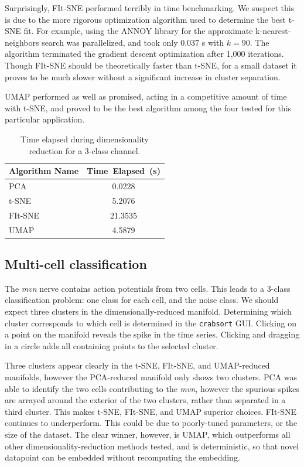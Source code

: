 \documentclass{article}
\begin{document}
Surprisingly, FIt-SNE performed terribly in time benchmarking.
We suspect this is due to the more rigorous optimization algorithm used
to determine the best t-SNE fit.
For example, using the ANNOY library for the approximate k-nearest-neighbors
search was parallelized, and took only 0.037 s with $k=90$.
The algorithm terminated the gradient descent optimization after 1,000 iterations.
Though FIt-SNE should be theoretically faster than t-SNE, for a small dataset
it proves to be much slower without a significant increase in cluster separation.

UMAP performed as well as promised, acting in a competitive amount of time with t-SNE,
and proved to be the best algorithm among the four tested for this particular application.

\begin{table}
  \caption{Time elapsed during dimensionality reduction for a 3-class channel.}
  \label{tbl:dim-red-time-1}
  \centering
  \begin{tabular}{lS}
    \toprule
    Algorithm Name     & Time~Elapsed~(s) \\
    \midrule
    PCA     & 0.0228 \\
    t-SNE   & 5.2076 \\
    FIt-SNE & 21.3535 \\
    UMAP    & 4.5879 \\
    \bottomrule
  \end{tabular}
\end{table}

\subsection{Multi-cell classification}

The \textit{mvn} nerve contains action potentials from two cells.
This leads to a 3-class classification problem: one class for each cell, and the noise class.
We should expect three clusters in the dimensionally-reduced manifold.
Determining which cluster corresponds to which cell is determined
in the \texttt{crabsort} GUI.
Clicking on a point on the manifold reveals the spike in the time series.
Clicking and dragging in a circle adds all containing points to the selected cluster.

Three clusters appear clearly in the t-SNE, FIt-SNE, and UMAP-reduced manifolds,
however the PCA-reduced manifold only shows two clusters.
PCA was able to identify the two cells contributing to the \textit{mvn},
however the spurious spikes are arrayed around the exterior of the two clusters,
rather than separated in a third cluster.
This makes t-SNE, FIt-SNE, and UMAP superior choices.
FIt-SNE continues to underperform.
This could be due to poorly-tuned parameters, or the size of the dataset.
The clear winner, however, is UMAP, which outperforms all other dimensionality-reduction methods tested,
and is deterministic, so that novel datapoint can be embedded without recomputing the embedding.
\end{document}
